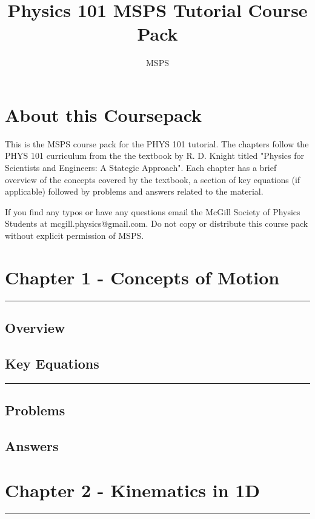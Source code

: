 \documentclass[a4paper,12pt]{article}
\title{Physics 101 MSPS Tutorial Course Pack}
\author{MSPS}
\begin{document}
\maketitle
\pagebreak
\tableofcontents

\pagebreak
\section*{About this Coursepack}

\hspace{5mm}This is the MSPS course pack for the PHYS 101 tutorial. The chapters follow the PHYS 101 curriculum from the the textbook by R. D. Knight titled "Physics for Scientists and Engineers: A Stategic Approach". Each chapter has a brief overview of the concepts covered by the textbook, a section of key equations (if applicable) followed by problems and answers related to the material. 

If you find any typos or have any questions email the McGill Society of Physics Students at mcgill.physics@gmail.com. Do not copy or distribute this course pack without explicit permission of MSPS.  

\pagebreak
\noindent\section*{Chapter 1 - Concepts of Motion}
\rule{\linewidth}{1pt}
\subsection*{Overview}

\subsection*{Key Equations}

\begin{center}
  \rule{6cm}{0.5pt}
\end{center}
\subsection*{Problems}
\subsection*{Answers}

\pagebreak
\section*{Chapter 2 - Kinematics in 1D}
\rule{\linewidth}{1pt}
\end{document}

